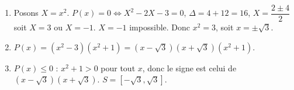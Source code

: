 \begin{enumerate}[label=\arabic*)]
  \item Posons $X = x^2$. $P(x) = 0 \iff X^2 - 2X - 3 = 0$, $\Delta = 4 + 12 = 16$, $X = \dfrac{2 \pm 4}{2}$ soit $X = 3$ ou $X = -1$. $X = -1$ impossible. Donc $x^2 = 3$, soit $x = \pm \sqrt{3}$.
  \item $P(x) = (x^2 - 3)(x^2 + 1) = (x - \sqrt{3})(x + \sqrt{3})(x^2 + 1)$.
  \item $P(x) \leq 0$ : $x^2 + 1 > 0$ pour tout $x$, donc le signe est celui de $(x-\sqrt{3})(x+\sqrt{3})$. $S = [-\sqrt{3}, \sqrt{3}]$.
\end{enumerate}